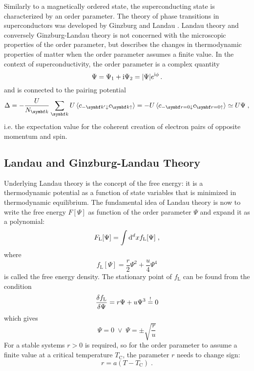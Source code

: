 \documentclass[../main.tex]{subfiles}
\begin{document}
Similarly to a magnetically ordered state, the superconducting state is characterized by an order parameter.
The theory of phase transitions in superconductors was developed by Ginzburg and Landau \cite{ginzburgTheorySuperconductivity1950}.
Landau theory and conversely Ginzburg-Landau theory is not concerned with the microscopic properties of the order parameter, but describes the changes in thermodynamic properties of matter when the order parameter assumes a finite value.
In the context of superconductivity, the order parameter is a complex quantity
\begin{equation}
	\Psi = \Psi_1 + \mathrm{i} \Psi_2 = \vert \Psi \vert e^{\mathrm{i} \phi} \,.
\end{equation}
and is connected to the pairing potential 
\begin{equation}
	\Delta = -\frac{U}{N_{\vb{k}}} \sum_{\vb{k}} U \braket{ c_{-\vb{k}^{\prime} \downarrow} c_{\vb{k} \uparrow}} = -U \braket{ c_{-\vb{r} = 0 \downarrow} c_{\vb{r} = 0 \uparrow}} \simeq U \Psi \;,
\end{equation}
i.e. the expectation value for the coherent creation of electron pairs of opposite momentum and spin.

\subsection*{Landau and Ginzburg-Landau Theory}\label{sub:Landau and Ginzburg-Landau Theory}

Underlying Landau theory \cite{landauTheoryPhaseTransitions1937} is the concept of the free energy: it is a thermodynamic potential as a function of state variables that is minimized in thermodynamic equilibrium.
The fundamental idea of Landau theory is now to write the free energy \(F[\Psi]\) as function of the order parameter \(\Psi\) and expand it as a polynomial:
\begin{equation}
	F_{\mathrm{L}}[\Psi] = \int \odif[order={d}]{x} f_{\mathrm{L}} [\Psi] \;,
\end{equation}
where
\begin{equation}
	f_{\mathrm{L}} [\Psi] = \frac{r}{2} \Psi^2 + \frac{u}{4} \Psi^4
\end{equation}
is called the free energy density.
The stationary point of \(f_{\mathrm{L}}\) can be found from the condition
\begin{equation}
	\fdv{f_{\mathrm{L}}}{\Psi} =  r \Psi + u \Psi^3 \overset{!}{=} 0
\end{equation}
which gives
\begin{equation}
	\Psi = 0 \; \lor \; \Psi = \pm \sqrt{\frac{r}{u}}
\end{equation}
For a stable systems \(r > 0\) is required, so for the order parameter to assume a finite value at a critical temperature \(T_{\mathrm{C}}\), the parameter \(r\) needs to change sign:
\begin{equation}
	r = a(T - T_{\mathrm{C}}) \;.
\end{equation}
\end{document}
